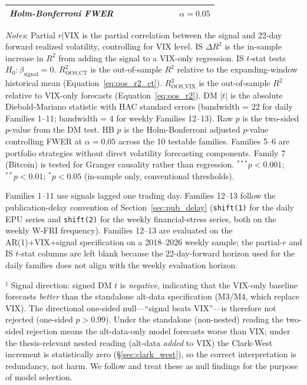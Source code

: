 \documentclass[12pt,a4paper]{article}
\begin{document}
\begin{table}[H]
\begin{threeparttable}
{\begin{tabular}{@{}clcccccccc@{}}
\multicolumn{2}{l}{\textit{Holm-Bonferroni FWER}} & & & & & & & & $\alpha = 0.05$ \\
\bottomrule
\end{tabular}%
}
\begin{tablenotes}
\small
\item \textit{Notes}: Partial $r|\text{VIX}$ is the partial correlation between the signal and 22-day forward realized volatility, controlling for VIX level. IS $\Delta R^2$ is the in-sample increase in $R^2$ from adding the signal to a VIX-only regression. IS $t$-stat tests $H_0: \beta_{\text{signal}} = 0$. $R^2_{\text{OOS,CT}}$ is the \citet{campbell2008} out-of-sample $R^2$ relative to the expanding-window historical mean (Equation~\ref{eq:oos_r2_ct}). $R^2_{\text{OOS,VIX}}$ is the out-of-sample $R^2$ relative to VIX-only forecasts (Equation~\ref{eq:oos_r2}). DM $|t|$ is the absolute Diebold-Mariano statistic with \citet{newey1987} HAC standard errors (bandwidth = 22 for daily Families 1--11; bandwidth = 4 for weekly Families 12--13). Raw $p$ is the two-sided $p$-value from the DM test. HB $p$ is the Holm-Bonferroni adjusted $p$-value controlling FWER at $\alpha = 0.05$ across the 10 testable families. Families 5--6 are portfolio strategies without direct volatility forecasting components. Family 7 (Bitcoin) is tested for Granger causality rather than regression. $^{***}p<0.001$; $^{**}p<0.01$; $^{*}p<0.05$ (in-sample only, conventional thresholds).
\item Families 1--11 use signals lagged one trading day. Families 12--13 follow the publication-delay convention of Section~\ref{sec:pub_delay} (\texttt{shift(1)} for the daily EPU series and \texttt{shift(2)} for the weekly financial-stress series, both on the weekly W-FRI frequency). Families 12--13 are evaluated on the AR(1)+VIX+signal specification on a 2018--2026 weekly sample; the partial-$r$ and IS $t$-stat columns are left blank because the 22-day-forward horizon used for the daily families does not align with the weekly evaluation horizon.
\item $^{\ddagger}$ Signal direction: signed DM $t$ is \emph{negative}, indicating that the VIX-only baseline forecasts \emph{better} than the standalone alt-data specification (M3/M4, which replace VIX). The directional one-sided null---``signal beats VIX''---is therefore not rejected (one-sided $p>0.99$). Under the standalone (non-nested) reading the two-sided rejection means the alt-data-only model forecasts worse than VIX; under the thesis-relevant nested reading (alt-data \emph{added} to VIX) the Clark-West increment is statistically zero (\S\ref{sec:clark_west}), so the correct interpretation is redundancy, not harm. We follow \citet{harvey2016} and treat these as null findings for the purpose of model selection.

\end{tablenotes}
\end{threeparttable}
\end{table}
\end{document}
